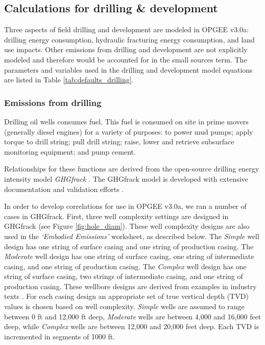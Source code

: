 \documentclass[11pt]{report}
\newcommand{\marg}[1]{{\footnotesize\textit{\textcolor{stanford}{'#1'}}}}
\newcommand{\marginnote}[1]{\marginpar{\marg{#1}}}
\newcommand{\version}{v3.0a}
\newcommand{\sheet}[1]{\textit{`{#1}'}}
\begin{document}
\subsection{Calculations for drilling \& development}

Three aspects of field drilling and development are modeled in OPGEE \version: drilling energy consumption, hydraulic fracturing energy consumption, and land use impacts. \marginnote{Active Field 3.8} Other emissions from drilling and development are not explicitly modeled and therefore would be accounted for in the small sources term. The parameters and variables used in the drilling and development model equations are listed in Table \ref{tab:defaults_drilling}. 

\subsubsection{Emissions from drilling}

Drilling oil wells consumes fuel. This fuel is consumed on site in prime movers (generally diesel engines) for a variety of purposes: to power mud pumps; apply torque to drill string; pull drill string; raise, lower and retrieve subsurface monitoring equipment; and pump cement. 

Relationships for these functions are derived from the open-source drilling energy intensity model \emph{GHGfrack} \cite{Vafi2016a, Vafi2016b, Vafi2016c}. The GHGfrack model is developed with extensive documentation and validation efforts \cite{Vafi2016a, Vafi2016b}.  

In order to develop correlations for use in OPGEE \version, we ran a number of cases in GHGfrack.  First, three well complexity settings are designed in GHGfrack (see Figure \ref{fig:hole_diam}).  These well complexity designs are also used in the \sheet{Embodied Emissions} worksheet, as described below.  \marginnote{Drilling \& Development 1.2}The \emph{Simple} well design has one string of surface casing and one string of production casing.  The \emph{Moderate} well design has one string of surface casing, one string of intermediate casing, and one string of production casing.  The \emph{Complex} well design has one string of surface casing, two strings of intermediate casing, and one string of production casing.  These wellbore designs are derived from examples in industry texts \cite{Mitchell2006}. For each casing design an appropriate set of true vertical depth (TVD) values is chosen based on well complexity. \emph{Simple} wells are assumed to range between 0 ft and 12,000 ft deep, \emph{Moderate} wells are between 4,000 and 16,000 feet deep, while \emph{Complex} wells are between 12,000 and 20,000 feet deep.  Each TVD is incremented in segments of 1000 ft.  
\end{document}
